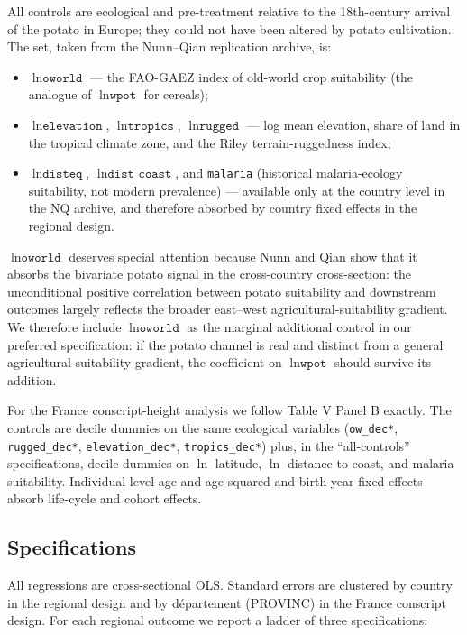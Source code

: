 All controls are ecological and pre-treatment relative to the 18th-century arrival of the potato in Europe; they could not have been altered by potato cultivation. The set, taken from the Nunn--Qian replication archive, is:
\begin{itemize}
\item $\ln \texttt{oworld}$ --- the FAO-GAEZ index of old-world crop suitability (the analogue of $\ln \texttt{wpot}$ for cereals);
\item $\ln \texttt{elevation}$, $\ln \texttt{tropics}$, $\ln \texttt{rugged}$ --- log mean elevation, share of land in the tropical climate zone, and the Riley terrain-ruggedness index;
\item $\ln \texttt{disteq}$, $\ln \texttt{dist\_coast}$, and \texttt{malaria} (historical malaria-ecology suitability, not modern prevalence) --- available only at the country level in the NQ archive, and therefore absorbed by country fixed effects in the regional design.
\end{itemize}

$\ln \texttt{oworld}$ deserves special attention because Nunn and Qian show that it absorbs the bivariate potato signal in the cross-country cross-section: the unconditional positive correlation between potato suitability and downstream outcomes largely reflects the broader east--west agricultural-suitability gradient. We therefore include $\ln \texttt{oworld}$ as the marginal additional control in our preferred specification: if the potato channel is real and distinct from a general agricultural-suitability gradient, the coefficient on $\ln \texttt{wpot}$ should survive its addition.

For the France conscript-height analysis we follow \citet{NunnQian2011} Table V Panel B exactly. The controls are decile dummies on the same ecological variables (\texttt{ow\_dec*}, \texttt{rugged\_dec*}, \texttt{elevation\_dec*}, \texttt{tropics\_dec*}) plus, in the ``all-controls'' specifications, decile dummies on $\ln$ latitude, $\ln$ distance to coast, and malaria suitability. Individual-level age and age-squared and birth-year fixed effects absorb life-cycle and cohort effects.

\subsection{Specifications}

All regressions are cross-sectional OLS. Standard errors are clustered by country in the regional design and by département (PROVINC) in the France conscript design. For each regional outcome we report a ladder of three specifications:

